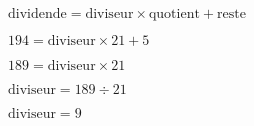     $\text{dividende}=\text{diviseur}\times \text{quotient} + \text{reste}$

    $194=\text{diviseur}\times 21 + 5$

    $189=\text{diviseur}\times 21$

    $\text{diviseur} = 189\div 21$

    $\text{diviseur} = 9$
